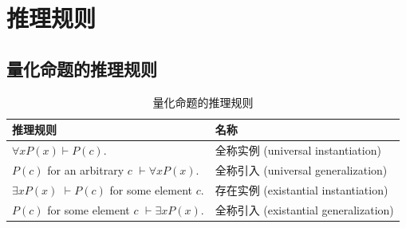\documentclass[10pt,UTF8]{book} %
\begin{document}
\section{推理规则}

\subsection{量化命题的推理规则}

\begin{table}[H]
    \centering
    \caption{量化命题的推理规则}
    \begin{tabular}{p{}p{}}
        \toprule
        \textbf{推理规则} & \textbf{名称} \\
        \midrule
        $\forall x P(x) \vdash P(c)$. & 全称实例 (universal instantiation) \\
        $P(c)$ for an arbitrary $c$ $\vdash \forall x P(x)$. & 全称引入 (universal generalization) \\
        $\exists x P(x)$ $\vdash P(c)$ for some element $c$. & 存在实例 (existantial instantiation) \\
        $P(c)$ for some element $c$ $\vdash \exists x P(x)$. & 全称引入 (existantial generalization) \\
        \bottomrule
    \end{tabular}
\end{table}
\end{document}
